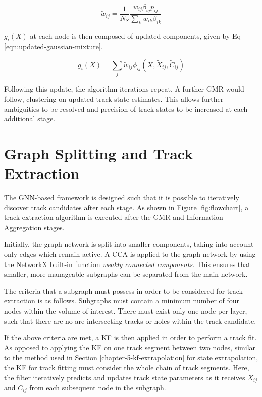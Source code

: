 \begin{equation}
\widetilde{w}_{ij} = \frac{1}{N_S} \frac{w_{ij}\beta_{ij} p_{ij}}{\sum_{k}w_{ik}\beta_{ik}}
\label{eqn:weights}
\end{equation}

$g_i(X)$ at each node is then composed of updated components, given by Eq \eqref{eqn:updated-gaussian-mixture}.

\begin{equation}
g_i(X) = \sum_{j} \widetilde{w}_{ij}\phi_{ij}(X, \widetilde{X}_{ij}, \widetilde{C}_{ij})
\label{eqn:updated-gaussian-mixture}
\end{equation}

Following this update, the algorithm iterations repeat. A further GMR would follow, clustering on updated track state estimates. This allows further ambiguities to be resolved and precision of track states to be increased at each additional stage.






\section{Graph Splitting and Track Extraction}
\label{gnn-track-extration}

The GNN-based framework is designed such that it is possible to iteratively discover track candidates after each stage. As shown in Figure \ref{fig:flowchart}, a track extraction algorithm is executed after the GMR and Information Aggregation stages.

Initially, the graph network is split into smaller components, taking into account only edges which remain active. A CCA is applied to the graph network by using the NetworkX built-in function \textit{weakly connected components}. This ensures that smaller, more manageable subgraphs can be separated from the main network.

The criteria that a subgraph must possess in order to be considered for track extraction is as follows. Subgraphs must contain a minimum number of four nodes within the volume of interest. There must exist only one node per layer, such that there are no are intersecting tracks or holes within the track candidate. 

If the above criteria are met, a KF is then applied in order to perform a track fit. As opposed to applying the KF on one track segment between two nodes, similar to the method used in Section \ref{chapter-5-kf-extrapolation} for state extrapolation, the KF for track fitting must consider the whole chain of track segments. Here, the filter iteratively predicts and updates track state parameters as it receives $X_{ij}$ and $C_{ij}$ from each subsequent node in the subgraph.

